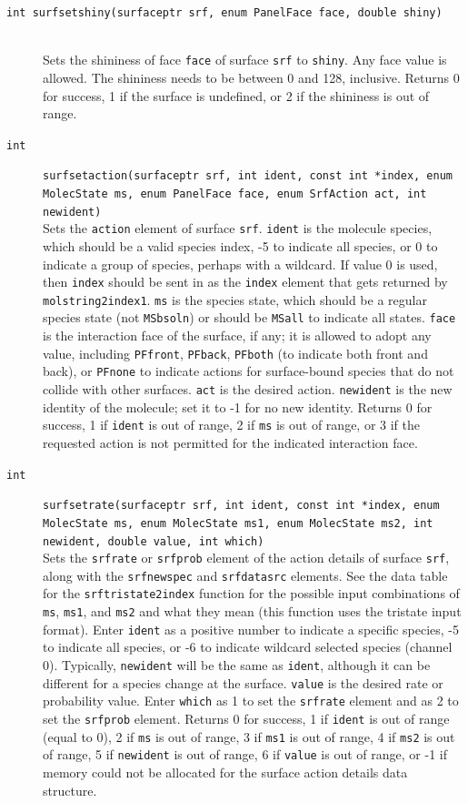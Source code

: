 \documentclass {scrbook}
\newcommand {\ttt} {\texttt}
\begin{document}
\begin{description}
\item[\ttt{int surfsetshiny(surfaceptr srf, enum PanelFace face, double shiny)}]
\hfill \\
Sets the shininess of face \ttt{face} of surface \ttt{srf} to \ttt{shiny}. Any face value is allowed. The shininess needs to be between 0 and 128, inclusive. Returns 0 for success, 1 if the surface is undefined, or 2 if the shininess is out of range.

\item[\ttt{int}]
\ttt{surfsetaction(surfaceptr srf, int ident, const int *index, enum MolecState ms, enum PanelFace face, enum SrfAction act, int newident)}
\hfill \\
Sets the \ttt{action} element of surface \ttt{srf}. \ttt{ident} is the molecule species, which should be a valid species index, -5 to indicate all species, or 0 to indicate a group of species, perhaps with a wildcard. If value 0 is used, then \ttt{index} should be sent in as the \ttt{index} element that gets returned by \ttt{molstring2index1}. \ttt{ms} is the species state, which should be a regular species state (not \ttt{MSbsoln}) or should be \ttt{MSall} to indicate all states. \ttt{face} is the interaction face of the surface, if any; it is allowed to adopt any value, including \ttt{PFfront}, \ttt{PFback}, \ttt{PFboth} (to indicate both front and back), or \ttt{PFnone} to indicate actions for surface-bound species that do not collide with other surfaces. \ttt{act} is the desired action. \ttt{newident} is the new identity of the molecule; set it to -1 for no new identity. Returns 0 for success, 1 if \ttt{ident} is out of range, 2 if \ttt{ms} is out of range, or 3 if the requested action is not permitted for the indicated interaction face.

\item[\ttt{int}]
\ttt{surfsetrate(surfaceptr srf, int ident, const int *index, enum MolecState ms, enum MolecState ms1, enum MolecState ms2, int newident, double value, int which)}
\hfill \\
Sets the \ttt{srfrate} or \ttt{srfprob} element of the action details of surface \ttt{srf}, along with the \ttt{srfnewspec} and \ttt{srfdatasrc} elements. See the data table for the \ttt{srftristate2index} function for the possible input combinations of \ttt{ms}, \ttt{ms1}, and \ttt{ms2} and what they mean (this function uses the tristate input format). Enter \ttt{ident} as a positive number to indicate a specific species, -5 to indicate all species, or -6 to indicate wildcard selected species (channel 0). Typically, \ttt{newident} will be the same as \ttt{ident}, although it can be different for a species change at the surface. \ttt{value} is the desired rate or probability value. Enter \ttt{which} as 1 to set the \ttt{srfrate} element and as 2 to set the \ttt{srfprob} element. Returns 0 for success, 1 if \ttt{ident} is out of range (equal to 0), 2 if \ttt{ms} is out of range, 3 if \ttt{ms1} is out of range, 4 if \ttt{ms2} is out of range, 5 if \ttt{newident} is out of range, 6 if \ttt{value} is out of range, or -1 if memory could not be allocated for the surface action details data structure.


\end{description}
\end{document}
